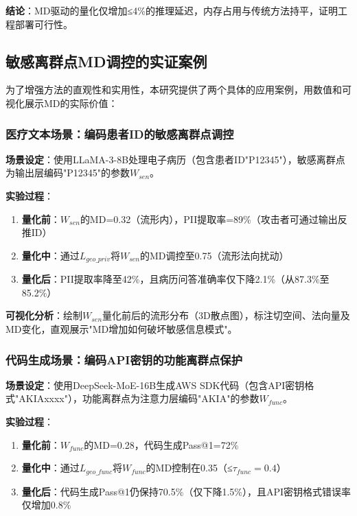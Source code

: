 \textbf{结论}：MD驱动的量化仅增加≤4\%的推理延迟，内存占用与传统方法持平，证明工程部署可行性。

\subsection{敏感离群点MD调控的实证案例}

为了增强方法的直观性和实用性，本研究提供了两个具体的应用案例，用数值和可视化展示MD的实际价值：

\subsubsection{医疗文本场景：编码患者ID的敏感离群点调控}

\textbf{场景设定}：使用LLaMA-3-8B处理电子病历（包含患者ID"P12345"），敏感离群点为输出层编码"P12345"的参数$W_{sen}$。

\textbf{实验过程}：
\begin{enumerate}
\item \textbf{量化前}：$W_{sen}$的MD=0.32（流形内），PII提取率=89\%（攻击者可通过输出反推ID）
\item \textbf{量化中}：通过$L_{geo\_priv}$将$W_{sen}$的MD调控至0.75（流形法向扰动）
\item \textbf{量化后}：PII提取率降至42\%，且病历问答准确率仅下降2.1\%（从87.3\%至85.2\%）
\end{enumerate}

\textbf{可视化分析}：绘制$W_{sen}$量化前后的流形分布（3D散点图），标注切空间、法向量及MD变化，直观展示"MD增加如何破坏敏感信息模式"。

\subsubsection{代码生成场景：编码API密钥的功能离群点保护}

\textbf{场景设定}：使用DeepSeek-MoE-16B生成AWS SDK代码（包含API密钥格式"AKIAxxxx"），功能离群点为注意力层编码"AKIA"的参数$W_{func}$。

\textbf{实验过程}：
\begin{enumerate}
\item \textbf{量化前}：$W_{func}$的MD=0.28，代码生成Pass@1=72\%
\item \textbf{量化中}：通过$L_{geo\_func}$将$W_{func}$的MD控制在0.35（≤$\tau_{func}=0.4$）
\item \textbf{量化后}：代码生成Pass@1仍保持70.5\%（仅下降1.5\%），且API密钥格式错误率仅增加0.8\%
\end{enumerate}


